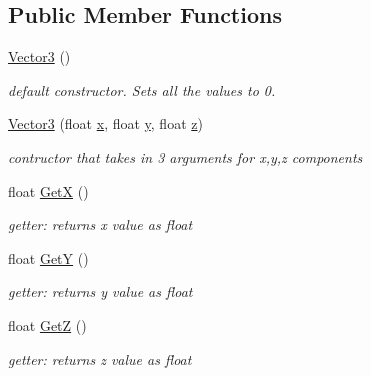 \subsection*{Public Member Functions}
\begin{DoxyCompactItemize}
\item 
\mbox{\label{classVector3_a0f49191f7e001e7f7ae1cb49522118b4}} 
\hyperlink{classVector3_a0f49191f7e001e7f7ae1cb49522118b4}{Vector3} ()
\begin{DoxyCompactList}\small\item\em default constructor. Sets all the values to 0. \end{DoxyCompactList}\item 
\mbox{\label{classVector3_ad53e22b52babdb90d423601f72467590}} 
\hyperlink{classVector3_ad53e22b52babdb90d423601f72467590}{Vector3} (float \hyperlink{classVector3_a7e2d3237b29a2f29d7b3d8b2934e35f2}{x}, float \hyperlink{classVector3_a86eb35a9fa2d5a49e7fad66a35fa9c13}{y}, float \hyperlink{classVector3_aa8c9461eb24bd2c364258078811a3e9d}{z})
\begin{DoxyCompactList}\small\item\em contructor that takes in 3 arguments for x,y,z components \end{DoxyCompactList}\item 
\mbox{\label{classVector3_a318ef58f84d43f17592e454b02a63658}} 
float \hyperlink{classVector3_a318ef58f84d43f17592e454b02a63658}{GetX} ()
\begin{DoxyCompactList}\small\item\em getter\+: returns x value as float \end{DoxyCompactList}\item 
\mbox{\label{classVector3_a9196c9e0e158774889b66988765db2cf}} 
float \hyperlink{classVector3_a9196c9e0e158774889b66988765db2cf}{GetY} ()
\begin{DoxyCompactList}\small\item\em getter\+: returns y value as float \end{DoxyCompactList}\item 
\mbox{\label{classVector3_ade396bf7b5423cd1179c65633db7c2d2}} 
float \hyperlink{classVector3_ade396bf7b5423cd1179c65633db7c2d2}{GetZ} ()
\begin{DoxyCompactList}\small\item\em getter\+: returns z value as float \end{DoxyCompactList}\item 

\end{DoxyCompactItemize}
